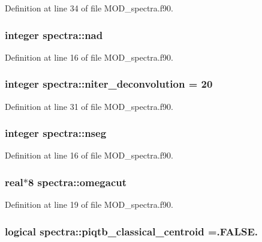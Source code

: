 Definition at line 34 of file M\-O\-D\-\_\-spectra.\-f90.

\hypertarget{classspectra_a45c919da29d33cfaf80a704aa631b346}{
\subsubsection[{nad}]{\setlength{\rightskip}{0pt plus 5cm}integer spectra\-::nad}}\label{classspectra_a45c919da29d33cfaf80a704aa631b346}


Definition at line 16 of file M\-O\-D\-\_\-spectra.\-f90.

\hypertarget{classspectra_a1aee53bf91686489408eeb9419bc706e}{
\subsubsection[{niter\-\_\-deconvolution}]{\setlength{\rightskip}{0pt plus 5cm}integer spectra\-::niter\-\_\-deconvolution = 20}}\label{classspectra_a1aee53bf91686489408eeb9419bc706e}


Definition at line 31 of file M\-O\-D\-\_\-spectra.\-f90.

\hypertarget{classspectra_ac0e35bcddedb3fbda30b8a359da97b94}{
\subsubsection[{nseg}]{\setlength{\rightskip}{0pt plus 5cm}integer spectra\-::nseg}}\label{classspectra_ac0e35bcddedb3fbda30b8a359da97b94}


Definition at line 16 of file M\-O\-D\-\_\-spectra.\-f90.

\hypertarget{classspectra_a464f70f16d24c366c5421572d902496f}{
\subsubsection[{omegacut}]{\setlength{\rightskip}{0pt plus 5cm}real$\ast$8 spectra\-::omegacut}}\label{classspectra_a464f70f16d24c366c5421572d902496f}


Definition at line 19 of file M\-O\-D\-\_\-spectra.\-f90.

\hypertarget{classspectra_ac6c092d4d7a7bd27589cb143b726cbb6}{
\subsubsection[{piqtb\-\_\-classical\-\_\-centroid}]{\setlength{\rightskip}{0pt plus 5cm}logical spectra\-::piqtb\-\_\-classical\-\_\-centroid =.F\-A\-L\-S\-E.}}\label{classspectra_ac6c092d4d7a7bd27589cb143b726cbb6}


